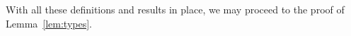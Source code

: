 \begin{comment}
We will prove the following strengthening of~Lemma~\ref{lem:types}:

\begin{lemma}%
  \label{lem:types1}
For any given number $q\in\N$ one can compute 
 a number $r\in\N$ with the following property.
	For any graph $G=(V,E)$, sets of vertices $A,B,S\subset V$	
	such that $A$  and $B$ are $r$-separated by $S$,
	for every tuple $\bar u\in A^{d}$, 
	the type $\tp^q_G(\bar u/B)$
	is computable from $\tp^{q}[B^r_S(\bar u), \bar u]$, and $G$ and $S$.
	
	
	
\end{lemma}

To show that~Lemma~\ref{lem:types1} implies~Lemma~\ref{lem:types}, define $p$ as $q\cdot r$. It suffices to show that
$\tp^{q}[B^r_S(\bar u), \bar u]$ is computable from $\tp_G^p(\bar u/S)$, and $G$ and $S$. This is the case, since
a formula $\phi(\bar y)$
can be relativized to $B^r_S(\bar u)$
by replacing each quantifier $\exists x$ by a formula
$\exists x\exists x_1\ldots\exists x_r\psi (x,x_1,\ldots,x_r)$,
where $\psi$ specifies that $x_1,\ldots,x_r,x$ form a path
starting in one of the vertices in $\bar u$, ending in $x$,
and omitting all vertices in $S$, which are enumerated as parameters.

It remains to prove~Lemma~\ref{lem:types1}.
\end{comment}


With all these definitions and results in place, we may proceed to the proof of Lemma~\ref{lem:types}.

